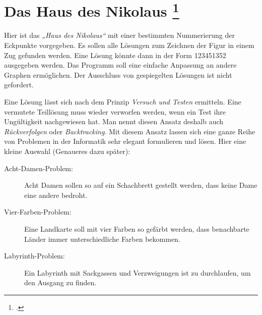 \documentclass{lehramt-informatik-aufgabe}
\begin{document}

\section{Das Haus des Nikolaus
\footcite[Diese Aufgabe stammt von der Website oberstufeninformatik.de. Die
Materialien sind nicht Freeware, sondern Beerware. Voraussetzung für
den Einsatz ist, dass der Benutzer ein Bier zum Wohle des Autors Horst
Gierhardt trinkt, Seite 2-3, Aufgabe 3]{aud:ab:3}
}

\noindent
Hier ist das \emph{„Haus des Nikolaus“} mit einer bestimmten
Nummerierung der Eckpunkte vorgegeben. Es sollen alle Lösungen zum
Zeichnen der Figur in einem Zug gefunden werden. Eine Lösung könnte dann
in der Form 123451352 ausgegeben werden. Das Programm soll eine einfache
Anpassung an andere Graphen ermöglichen. Der Ausschluss von gespiegelten
Lösungen ist nicht gefordert.

\begin{center}
\end{center}

\begin{liExkurs}[Backtracking]
Eine Lösung lässt sich nach dem Prinzip \emph{Versuch und Testen}
ermitteln. Eine vermutete Teillösung muss wieder verworfen werden, wenn
ein Test ihre Ungültigkeit nachgewiesen hat. Man nennt diesen Ansatz
deshalb auch \emph{Rückverfolgen} oder \emph{Backtracking}. Mit diesem
Ansatz lassen sich eine ganze Reihe von Problemen in der Informatik sehr
elegant formulieren und lösen. Hier eine kleine Auswahl (Genaueres dazu
später):

\begin{description}
\item[Acht-Damen-Problem:] Acht Damen sollen so auf ein Schachbrett
gestellt werden, dass keine Dame eine andere bedroht.

\item[Vier-Farben-Problem:] Eine Landkarte soll mit vier Farben so
gefärbt werden, dass benachbarte Länder immer unterschiedliche Farben
bekommen.

\item[Labyrinth-Problem:] Ein Labyrinth mit Sackgassen und Verzweigungen
ist zu durchlaufen, um den Ausgang zu finden.
\end{description}
\end{liExkurs}
\end{document}
